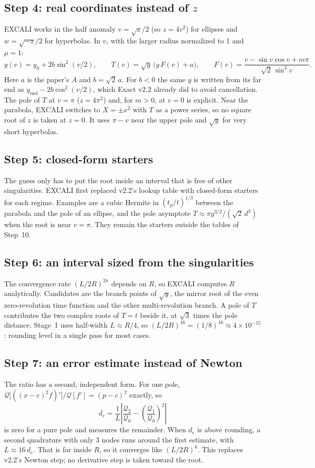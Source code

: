 \documentclass[11pt]{article}
\newcommand{\Q}{\mathcal{Q}}
\begin{document}
\subsection*{Step 4: real coordinates instead of $z$}
EXCALI works in the half anomaly $v = \sqrt{z}/2$ (so $z = 4v^2$) for ellipses and $w = \sqrt{-z}/2$ for hyperbolas. In $v$, with the larger radius normalized to 1 and $\mu=1$:
\begin{equation}
  y(v) = y_0 + 2b\sin^2(v/2), \qquad T(v) = \sqrt{y}\,\big(y\,F(v) + a\big), \qquad F(v) = \frac{v - \sin v\cos v + m\pi}{\sqrt2\,\sin^3 v}.
\end{equation}
Here $a$ is the paper's $A$ and $b = \sqrt2\,a$. For $b<0$ the same $y$ is written from its far end as $y_\text{end} - 2b\cos^2(v/2)$, which Exact v2.2 already did to avoid cancellation. The pole of $T$ at $v=\pi$ ($z=4\pi^2$) and, for $m>0$, at $v=0$ is explicit. Near the parabola, EXCALI switches to $X=\pm x^2$ with $T$ as a power series, so no square root of $z$ is taken at $z=0$. It uses $\pi-v$ near the upper pole and $\sqrt{y}$ for very short hyperbolas.

\subsection*{Step 5: closed-form starters}
The guess only has to put the root inside an interval that is free of other singularities. EXCALI first replaced v2.2's lookup table with closed-form starters for each regime. Examples are a cubic Hermite in $(t_p/t)^{1/3}$ between the parabola and the pole of an ellipse, and the pole asymptote $T \approx \pi y^{3/2}/(\sqrt2\,d^3)$ when the root is near $v=\pi$. They remain the starters outside the tables of Step~10.

\subsection*{Step 6: an interval sized from the singularities}
The convergence rate $(L/2R)^{2n}$ depends on $R$, so EXCALI computes $R$ analytically. Candidates are the branch points of $\sqrt{y}$, the mirror root of the even zero-revolution time function and the other multi-revolution branch. A pole of $T$ contributes the two complex roots of $T=t$ beside it, at $\sqrt3$ times the pole distance. Stage~1 uses half-width $L\approx R/4$, so $(L/2R)^{16} = (1/8)^{16} \approx 4\times10^{-15}$: rounding level in a single pass for most cases.

\subsection*{Step 7: an error estimate instead of Newton}
The ratio has a second, independent form. For one pole, $\Q\big[((x-c)^2f)'\big]/\Q[f'] = (p-c)^2$ exactly, so
\[
  d_e = \frac{1}{L}\left|\frac{\Q_2}{\Q_0} - \left(\frac{\Q_1}{\Q_0}\right)^2\right|
\]
is zero for a pure pole and measures the remainder. When $d_e$ is above rounding, a second quadrature with only 3 nodes runs around the first estimate, with $L \approx 16\,d_e$. That is far inside $R$, so it converges like $(L/2R)^6$. This replaces v2.2's Newton step; no derivative step is taken toward the root.
\end{document}

